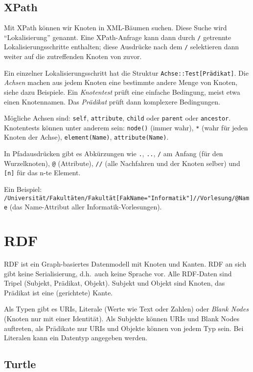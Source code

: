 \documentclass[a4paper,parskip=half*,DIV=15,fontsize=11pt]{scrartcl}
\begin{document}
\subsection{XPath}

Mit XPath können wir Knoten in XML-Bäumen suchen. Diese Suche wird ``Lokalisierung'' genannt. Eine XPath-Anfrage kann dann durch \lstinline{/} getrennte Lokalisierungsschritte enthalten; diese Ausdrücke nach dem \lstinline{/} selektieren dann weiter auf die zutreffenden Knoten von zuvor.

Ein einzelner Lokalisierungsschritt hat die Struktur \lstinline{Achse::Test[Prädikat]}. Die \emph{Achsen} machen aus jedem Knoten eine bestimmte andere Menge von Knoten, siehe dazu Beispiele. Ein \emph{Knotentest} prüft eine einfache Bedingung, meist etwa einen Knotennamen. Das \emph{Prädikat} prüft dann komplexere Bedingungen.

Mögliche Achsen sind: \lstinline{self}, \lstinline{attribute}, \lstinline{child} oder \lstinline{parent} oder \lstinline{ancestor}. Knotentests können unter anderem sein: \lstinline{node()} (immer wahr), \lstinline{*} (wahr für jeden Knoten der Achse), \lstinline{element(Name)}, \lstinline{attribute(Name)}.

In Pfadausdrücken gibt es Abkürzungen wie \lstinline{.}, \lstinline{..}, \lstinline{/} am Anfang (für den Wurzelknoten), \lstinline{@} (Attribute), \lstinline{//} (alle Nachfahren und der Knoten selber) und \lstinline{[n]} für das n-te Element.

Ein Beispiel: \lstinline{/Universität/Fakultäten/Fakultät[FakName="Informatik"]//Vorlesung/@Name} (das Name-Attribut aller Informatik-Vorlesungen).

\section{RDF}

RDF ist ein Graph-basiertes Datenmodell mit Knoten und Kanten. RDF an sich gibt keine Serialisierung, d.h.\ auch keine Sprache vor. Alle RDF-Daten sind Tripel (Subjekt, Prädikat, Objekt). Subjekt und Objekt sind Knoten, das Prädikat ist eine (gerichtete) Kante.

Als Typen gibt es URIs, Literale (Werte wie Text oder Zahlen) oder \emph{Blank Nodes} (Knoten nur mit einer Identität). Als Subjekte können URIs und Blank Nodes auftreten, als Prädikate nur URIs und Objekte können von jedem Typ sein. Bei Literalen kann ein Datentyp angegeben werden.

\subsection{Turtle}
\end{document}
